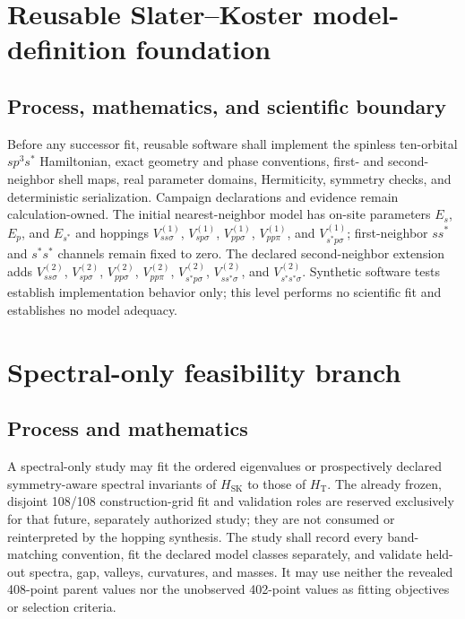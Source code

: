 \documentclass[11pt]{report}
\begin{document}
\chapter{Reusable Slater--Koster model-definition foundation}

\section{Process, mathematics, and scientific boundary}

Before any successor fit, reusable software shall implement the spinless ten-orbital
$sp^3s^*$ Hamiltonian, exact geometry and phase conventions, first- and second-neighbor
shell maps, real parameter domains, Hermiticity, symmetry checks, and deterministic
serialization.  Campaign declarations and evidence remain calculation-owned.  The
initial nearest-neighbor model has on-site parameters $E_s$, $E_p$, and $E_{s^*}$ and
hoppings $V_{ss\sigma}^{(1)}$, $V_{sp\sigma}^{(1)}$,
$V_{pp\sigma}^{(1)}$, $V_{pp\pi}^{(1)}$, and
$V_{s^*p\sigma}^{(1)}$; first-neighbor $ss^*$ and $s^*s^*$ channels remain fixed to
zero.  The declared second-neighbor extension adds
$V_{ss\sigma}^{(2)}$, $V_{sp\sigma}^{(2)}$,
$V_{pp\sigma}^{(2)}$, $V_{pp\pi}^{(2)}$,
$V_{s^*p\sigma}^{(2)}$, $V_{ss^*\sigma}^{(2)}$, and
$V_{s^*s^*\sigma}^{(2)}$.  Synthetic software tests establish implementation behavior
only; this level performs no scientific fit and establishes no model adequacy.

\chapter{Spectral-only feasibility branch}

\section{Process and mathematics}

A spectral-only study may fit the ordered eigenvalues or prospectively declared
symmetry-aware spectral invariants of $H_{\mathrm{SK}}$ to those of $H_{\mathrm{T}}$.
The already frozen, disjoint 108/108 construction-grid fit and validation roles are
reserved exclusively for that future, separately authorized study; they are not consumed
or reinterpreted by the hopping synthesis.  The study shall record every band-matching
convention, fit the declared model classes separately, and validate held-out spectra,
gap, valleys, curvatures, and masses.  It may use neither the revealed 408-point parent
values nor the unobserved 402-point values as fitting objectives or selection criteria.
\end{document}
